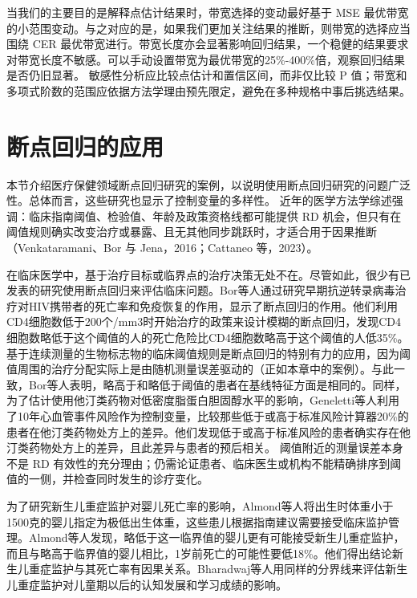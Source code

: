 \documentclass[
  chinese-hans,
  letterpaper,
  DIV=11,
  numbers=noendperiod]{scrreprt}
\begin{document}
当我们的主要目的是解释点估计结果时，带宽选择的变动最好基于 MSE
最优带宽的小范围变动。与之对应的是，如果我们更加关注结果的推断，则带宽的选择应当围绕
CER
最优带宽进行。带宽长度亦会显著影响回归结果，一个稳健的结果要求对带宽长度不敏感。可以手动设置带宽为最优带宽的25\%-400\%倍，观察回归结果是否仍旧显著。
敏感性分析应比较点估计和置信区间，而非仅比较 P
值；带宽和多项式阶数的范围应依据方法学理由预先限定，避免在多种规格中事后挑选结果。

\section{断点回归的应用}\label{ux65adux70b9ux56deux5f52ux7684ux5e94ux7528}

本节介绍医疗保健领域断点回归研究的案例，以说明使用断点回归研究的问题广泛性。总体而言，这些研究也显示了控制变量的多样性。
近年的医学方法学综述强调：临床指南阈值、检验值、年龄及政策资格线都可能提供
RD
机会，但只有在阈值规则确实改变治疗或暴露、且无其他同步跳跃时，才适合用于因果推断（Venkataramani、Bor
与 Jena，2016；Cattaneo 等，2023）。

在临床医学中，基于治疗目标或临界点的治疗决策无处不在。尽管如此，很少有已发表的研究使用断点回归来评估临床问题。Bor等人通过研究早期抗逆转录病毒治疗对HIV携带者的死亡率和免疫恢复的作用，显示了断点回归的作用。他们利用CD4细胞数低于200个/mm3时开始治疗的政策来设计模糊的断点回归，发现CD4细胞数略低于这个阈值的人的死亡危险比CD4细胞数略高于这个阈值的人低35\%。基于连续测量的生物标志物的临床阈值规则是断点回归的特别有力的应用，因为阈值周围的治疗分配实际上是由随机测量误差驱动的（正如本章中的案例）。与此一致，Bor等人表明，略高于和略低于阈值的患者在基线特征方面是相同的。同样，为了估计使用他汀类药物对低密度脂蛋白胆固醇水平的影响，Geneletti等人利用了10年心血管事件风险作为控制变量，比较那些低于或高于标准风险计算器20\%的患者在他汀类药物处方上的差异。他们发现低于或高于标准风险的患者确实存在他汀类药物处方上的差异，且此差异与患者的预后相关。
阈值附近的测量误差本身不是 RD
有效性的充分理由；仍需论证患者、临床医生或机构不能精确排序到阈值的一侧，并检查同时发生的诊疗变化。

为了研究新生儿重症监护对婴儿死亡率的影响，Almond等人将出生时体重小于1500克的婴儿指定为极低出生体重，这些患儿根据指南建议需要接受临床监护管理。Almond等人发现，略低于这一临界值的婴儿更有可能接受新生儿重症监护，而且与略高于临界值的婴儿相比，1岁前死亡的可能性要低18\%。他们得出结论新生儿重症监护与其死亡率有因果关系。Bharadwaj等人用同样的分界线来评估新生儿重症监护对儿童期以后的认知发展和学习成绩的影响。
\end{document}
